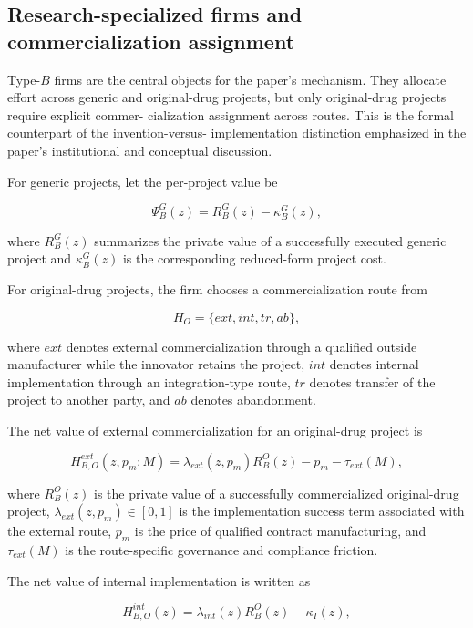 \documentclass[12pt]{article}
\begin{document}
\subsection{Research-specialized firms and commercialization assignment}

Type-$B$ firms are the central objects for the paper's mechanism. They allocate effort across
generic and original-drug projects, but only original-drug projects require explicit commer-
cialization assignment across routes. This is the formal counterpart of the invention-versus-
implementation distinction emphasized in the paper's institutional and conceptual discussion.

For generic projects, let the per-project value be

\begin{equation}
\Psi_B^G(z)=R_B^G(z)-\kappa_B^G(z),
\end{equation}

where $R_B^G(z)$ summarizes the private value of a successfully executed generic project and
$\kappa_B^G(z)$ is the corresponding reduced-form project cost.

For original-drug projects, the firm chooses a commercialization route from

\[
H_O=\{ext,int,tr,ab\},
\]

where $ext$ denotes external commercialization through a qualified outside manufacturer
while the innovator retains the project, $int$ denotes internal implementation through an
integration-type route, $tr$ denotes transfer of the project to another party, and $ab$ denotes
abandonment.

The net value of external commercialization for an original-drug project is

\begin{equation}
H_{B,O}^{ext}(z,p_m;M)=\lambda_{ext}(z,p_m)R_B^O(z)-p_m-\tau_{ext}(M),
\end{equation}

where $R_B^O(z)$ is the private value of a successfully commercialized original-drug project,
$\lambda_{ext}(z,p_m)\in[0,1]$ is the implementation success term associated with the external route,
$p_m$ is the price of qualified contract manufacturing, and $\tau_{ext}(M)$ is the route-specific governance
and compliance friction.

The net value of internal implementation is written as

\begin{equation}
H_{B,O}^{int}(z)=\lambda_{int}(z)R_B^O(z)-\kappa_I(z),
\end{equation}
\end{document}
